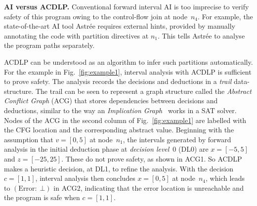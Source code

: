 \noindent \textbf{AI versus ACDLP.}
Conventional forward interval AI is too imprecise to verify safety of this
program owing to the control-flow join at node~$n_4$.  For example, the
state-of-the-art AI tool Astr{\'e}e requires external hints, provided by
manually annotating the code with partition directives at $n_1$.  This
tells Astr{\'e}e to analyse the program paths separately.

ACDLP can be understood as an algorithm to infer such
partitions automatically.  For the example in Fig.~\ref{fig:example1}, interval analysis
with ACDLP is sufficient to prove safety.  The analysis records the
decisions and deductions in a \textit{trail} data-structure.  The trail can
be seen to represent a graph structure called the {\em Abstract Conflict
Graph} (ACG) that stores dependencies between decisions and deductions, similar to the way an \emph{Implication Graph}~\cite{cdcl} works in a SAT solver. 
Nodes of the ACG in the second column of Fig.~\ref{fig:example1} are
labelled with the CFG location and the corresponding abstract value. 
Beginning with the assumption that $v=[0,5]$ at node~$n_1$, the intervals
generated by forward analysis in the initial deduction phase at
\emph{decision level}~0 (DL0) are $x=[-5,5]$ and $z=[-25,25]$.  
These do not prove safety, as shown in ACG1.  So ACDLP makes a
heuristic decision, at DL1, to refine the analysis.  With the decision
$c=[1,1]$, interval analysis then concludes $x=[0,5]$ at node~$n_4$, which
leads to $(\mathrm{Error}{:}\;\bot)$ in ACG2, indicating that the error
location is unreachable and the program is safe when $c=[1,1]$.

